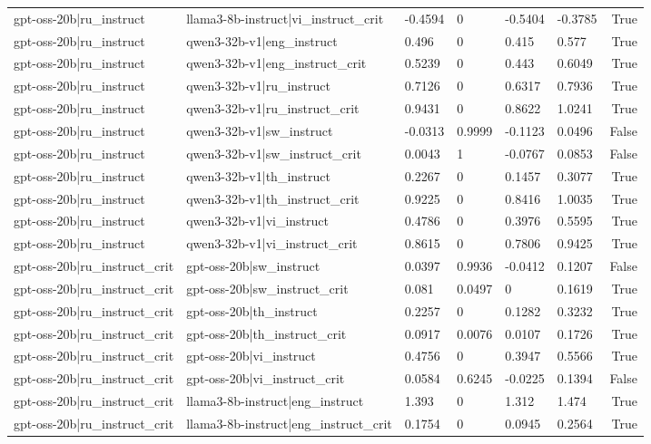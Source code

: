 \begin{table}
\begin{tabular}{llllllr}
gpt-oss-20b|ru_instruct & llama3-8b-instruct|vi_instruct_crit & -0.4594 & 0 & -0.5404 & -0.3785 & True \\
gpt-oss-20b|ru_instruct & qwen3-32b-v1|eng_instruct & 0.496 & 0 & 0.415 & 0.577 & True \\
gpt-oss-20b|ru_instruct & qwen3-32b-v1|eng_instruct_crit & 0.5239 & 0 & 0.443 & 0.6049 & True \\
gpt-oss-20b|ru_instruct & qwen3-32b-v1|ru_instruct & 0.7126 & 0 & 0.6317 & 0.7936 & True \\
gpt-oss-20b|ru_instruct & qwen3-32b-v1|ru_instruct_crit & 0.9431 & 0 & 0.8622 & 1.0241 & True \\
gpt-oss-20b|ru_instruct & qwen3-32b-v1|sw_instruct & -0.0313 & 0.9999 & -0.1123 & 0.0496 & False \\
gpt-oss-20b|ru_instruct & qwen3-32b-v1|sw_instruct_crit & 0.0043 & 1 & -0.0767 & 0.0853 & False \\
gpt-oss-20b|ru_instruct & qwen3-32b-v1|th_instruct & 0.2267 & 0 & 0.1457 & 0.3077 & True \\
gpt-oss-20b|ru_instruct & qwen3-32b-v1|th_instruct_crit & 0.9225 & 0 & 0.8416 & 1.0035 & True \\
gpt-oss-20b|ru_instruct & qwen3-32b-v1|vi_instruct & 0.4786 & 0 & 0.3976 & 0.5595 & True \\
gpt-oss-20b|ru_instruct & qwen3-32b-v1|vi_instruct_crit & 0.8615 & 0 & 0.7806 & 0.9425 & True \\
gpt-oss-20b|ru_instruct_crit & gpt-oss-20b|sw_instruct & 0.0397 & 0.9936 & -0.0412 & 0.1207 & False \\
gpt-oss-20b|ru_instruct_crit & gpt-oss-20b|sw_instruct_crit & 0.081 & 0.0497 & 0 & 0.1619 & True \\
gpt-oss-20b|ru_instruct_crit & gpt-oss-20b|th_instruct & 0.2257 & 0 & 0.1282 & 0.3232 & True \\
gpt-oss-20b|ru_instruct_crit & gpt-oss-20b|th_instruct_crit & 0.0917 & 0.0076 & 0.0107 & 0.1726 & True \\
gpt-oss-20b|ru_instruct_crit & gpt-oss-20b|vi_instruct & 0.4756 & 0 & 0.3947 & 0.5566 & True \\
gpt-oss-20b|ru_instruct_crit & gpt-oss-20b|vi_instruct_crit & 0.0584 & 0.6245 & -0.0225 & 0.1394 & False \\
gpt-oss-20b|ru_instruct_crit & llama3-8b-instruct|eng_instruct & 1.393 & 0 & 1.312 & 1.474 & True \\
gpt-oss-20b|ru_instruct_crit & llama3-8b-instruct|eng_instruct_crit & 0.1754 & 0 & 0.0945 & 0.2564 & True \\

\end{tabular}
\end{table}
